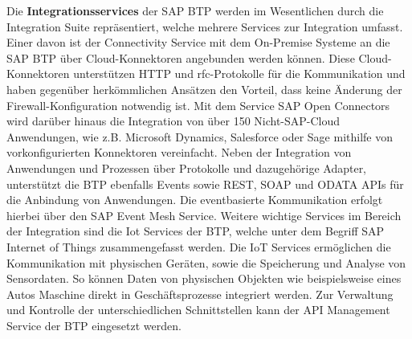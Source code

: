 Die \textbf{Integrationsservices} der SAP BTP werden im Wesentlichen durch die Integration Suite repräsentiert, welche mehrere Services zur Integration umfasst. Einer davon ist der Connectivity Service mit dem On-Premise Systeme an die SAP BTP über Cloud-Konnektoren angebunden werden können. \autocite[Vgl.][]{CLOUDCONNECTOR} Diese Cloud-Konnektoren unterstützen HTTP und \ac{rfc}-Protokolle für die Kommunikation und haben gegenüber herkömmlichen Ansätzen den Vorteil, dass keine Änderung der Firewall-Konfiguration notwendig ist. Mit dem Service SAP Open Connectors wird darüber hinaus die Integration von über 150 Nicht-SAP-Cloud Anwendungen, wie z.B. Microsoft Dynamics, Salesforce oder Sage mithilfe von vorkonfigurierten Konnektoren vereinfacht. \autocite[Vgl.][S. 28]{INTEGRATIONSUITE2023} Neben der Integration von Anwendungen und Prozessen über Protokolle und dazugehörige Adapter, unterstützt die BTP ebenfalls Events sowie REST, SOAP und ODATA APIs für die Anbindung von Anwendungen. \autocite[Vgl.][]{BTPAPIS2023} Die eventbasierte Kommunikation erfolgt hierbei über den SAP Event Mesh Service.  \autocite[Vgl.][S. 4]{EVENTMESH2022} Weitere wichtige Services im Bereich der Integration sind die Iot Services der BTP, welche unter dem Begriff SAP Internet of Things zusammengefasst werden. \autocite[Vgl.][S. 163]{SEUBERT} Die IoT Services ermöglichen die Kommunikation mit physischen Geräten, sowie die Speicherung und Analyse von Sensordaten. So können Daten von physischen Objekten wie beispielsweise eines Autos Maschine direkt in Geschäftsprozesse integriert werden. \autocite[Vgl.][]{IOTBTP2023}  Zur Verwaltung und Kontrolle der unterschiedlichen Schnittstellen kann der API Management Service der BTP eingesetzt werden. \autocite[Vgl.][S. 72]{SEUBERT} 

